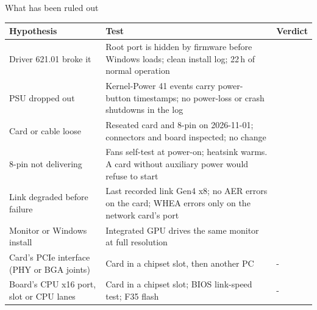 \documentclass[aspectratio=169,11pt]{beamer}
\begin{document}
\begin{frame}{What has been ruled out}
  \scriptsize
  \renewcommand{\arraystretch}{1.0}
  \begin{tabularx}{\textwidth}{@{}p{3.3cm}Lp{1.7cm}@{}}
    \toprule
    \textbf{Hypothesis} & \textbf{Test} & \textbf{Verdict} \\
    \midrule
    Driver 621.01 broke it & Root port is hidden by firmware before Windows loads; clean install log; 22\,h of normal operation &  \\
    PSU dropped out & Kernel-Power 41 events carry power-button timestamps; no power-loss or crash shutdowns in the log &  \\
    Card or cable loose & Reseated card and 8-pin on 2026-11-01; connectors and board inspected; no change &  \\
    8-pin not delivering & Fans self-test at power-on; heatsink warms. A card without auxiliary power would refuse to start &  \\
    Link degraded before failure & Last recorded link Gen4 x8; no AER errors on the card; WHEA errors only on the network card's port &  \\
    Monitor or Windows install & Integrated GPU drives the same monitor at full resolution &  \\
    Card's PCIe interface (PHY or BGA joints) & Card in a chipset slot, then another PC & \hyp \\
    Board's CPU x16 port, slot or CPU lanes & Card in a chipset slot; BIOS link-speed test; F35 flash & \hyp \\
    \bottomrule
  \end{tabularx}
\end{frame}
\end{document}
